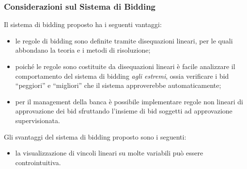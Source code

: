 \subsubsection{Considerazioni sul Sistema di Bidding}

Il sistema di bidding proposto ha i seguenti vantaggi:
\begin{itemize}
	\item le regole di bidding sono definite tramite disequazioni lineari, per le quali abbondano la teoria e i metodi di risoluzione;

	\item poiché le regole sono costituite da disequazioni lineari è facile analizzare il comportamento del sistema di bidding \emph{agli estremi}, ossia verificare i bid ``peggiori'' e ``migliori'' che il sistema approverebbe automaticamente;

	\item per il management della banca è possibile implementare regole non lineari di approvazione dei bid sfruttando l'insieme di bid soggetti ad approvazione supervisionata.
\end{itemize}

Gli svantaggi del sistema di bidding proposto sono i seguenti:
\begin{itemize}
	\item la visualizzazione di vincoli lineari su molte variabili può essere controintuitiva.
\end{itemize}

